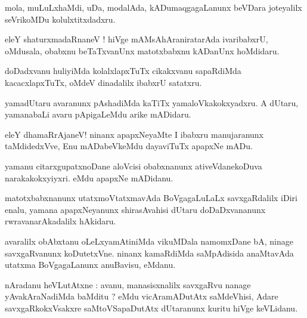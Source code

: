 \documentclass{article}
\begin{document}
\begin{mn}
mola, muLuLxhaMdi, uDa, modalAda, kADumaqgagaLanunx beVDara joteyalilx seVrikoMDu kolulxtitxdadxru.
\end{mn}

\begin{mn}
eleY shaturxmadaRnaneV ! hiVge mAMsAhAraniratarAda ivaribabxrU, oMdusala, obabxnu beTaTxvanUnx 
matotxbabxnu kADanUnx hoMdidaru.
\end{mn}

\begin{mn}
doDadxvanu huliyiMda kolalxlapxTuTx cikakxvanu sapaRdiMda kacacxlapxTuTx, oMdeV dinadalilx ibabxrU 
satatxru.
\end{mn}

\begin{mn}
yamadUtaru avaranunx pAshadiMda kaTiTx yamaloVkakokxyadxru. A dUtaru, yamanabaLi avaru 
pApigaLeMdu arike mADidaru.
\end{mn}

\begin{mn}
eleY  dhamaRrAjaneV! ninanx apapxNeyaMte I ibabxru manujaranunx taMdidedxVve, Enu mADabeVkeMdu 
dayaviTuTx apapxNe mADu.
\end{mn}

\begin{mn}
yamanu citarxgupatxnoDane aloVcisi obabxnanunx ativeVdanekoDuva narakakokxyiyxri. eMdu apapxNe 
mADidanu.
\end{mn}

\begin{mn}
matotxbabxnanunx utatxmoVtatxmavAda BoVgagaLuLaLx savxgaRdalilx iDiri enalu, yamana apapxNeyanunx 
shirasAvahisi dUtaru doDaDxvananunx rwravanarAkadalilx hAkidaru.
\end{mn}

\begin{mn}
avaralilx obAbxtanu oLeLxyamAtiniMda vikuMDala namomxDane bA, ninage savxgaRvanunx koDutetxVne. 
ninanx kamaRdiMda saMpAdisida anaMtavAda utatxma BoVgagaLanunx anuBavisu, eMdanu.
\end{mn}


\begin{mn}
nAradanu heVLutAtxne : avanu, manasisxnalilx savxgaRvu nanage yAvakAraNadiMda baMditu ? eMdu 
vicAramADutAtx saMdeVhisi, Adare savxgaRkokxVsakxre saMtoVSapaDutAtx dUtaranunx kuritu hiVge 
keVLidanu.
\end{mn}
\end{document}
